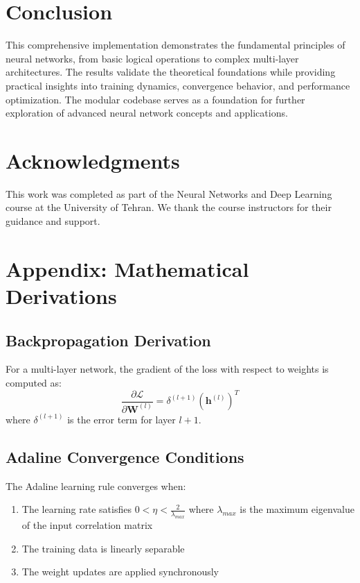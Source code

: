 \documentclass[conference]{IEEEtran}
\begin{document}
\section{Conclusion}\label{sec:conclusion}
This comprehensive implementation demonstrates the fundamental principles of neural networks, from basic logical operations to complex multi-layer architectures. The results validate the theoretical foundations while providing practical insights into training dynamics, convergence behavior, and performance optimization. The modular codebase serves as a foundation for further exploration of advanced neural network concepts and applications.

\section*{Acknowledgments}
This work was completed as part of the Neural Networks and Deep Learning course at the University of Tehran. We thank the course instructors for their guidance and support.

\appendices
\section{Appendix: Mathematical Derivations}\label{appendix:math}

\subsection{Backpropagation Derivation}
For a multi-layer network, the gradient of the loss with respect to weights is computed as:
\begin{equation}
\frac{\partial \mathcal{L}}{\partial \mathbf{W}^{(l)}} = \delta^{(l+1)} (\mathbf{h}^{(l)})^T
\end{equation}
where $\delta^{(l+1)}$ is the error term for layer $l+1$.

\subsection{Adaline Convergence Conditions}
The Adaline learning rule converges when:
\begin{enumerate}
    \item The learning rate satisfies $0 < \eta < \frac{2}{\lambda_{max}}$ where $\lambda_{max}$ is the maximum eigenvalue of the input correlation matrix
    \item The training data is linearly separable
    \item The weight updates are applied synchronously
\end{enumerate}
\end{document}
